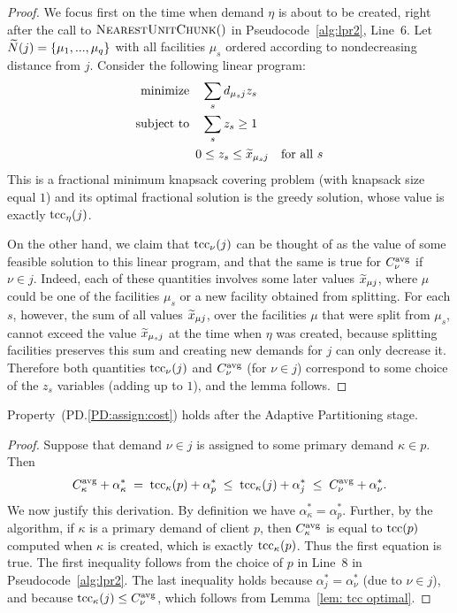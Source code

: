 \documentclass{llncs}
\begin{document}
\begin{proof}
  We focus first on the time when demand $\eta$ is about to be created,
  right after the call to ${\textsc{NearestUnitChunk}}()$ in
  Pseudocode~\ref{alg:lpr2}, Line~6.  Let ${\widetilde N}(j) =
  \{\mu_1,...,\mu_q\}$ with all facilities $\mu_s$ ordered
  according to nondecreasing distance from $j$.  Consider
  the following linear program:
%
\begin{alignat*}{1}
	\textrm{minimize} \quad & \sum_s d_{\mu_s j}z_s
			\\
	\textrm{subject to} \quad & \sum_s z_s  \ge 1
			\\
 	0 &\le z_s \le {\widetilde x}_{\mu_s j} \quad \textrm{for all}\ s
\end{alignat*}
%
  This is a fractional
  minimum knapsack covering problem (with knapsack size equal $1$) and its optimal fractional
  solution is the greedy solution, whose value is exactly
  $\textrm{tcc}_\eta(j)$.  

On the other hand, we claim that
  $\textrm{tcc}_\nu(j)$ can be thought of as the value of some feasible
  solution to this linear program, and that the same is true for $C^{{\mbox{\scriptsize\rm avg}}}_{\nu}$ if $\nu\in j$.
  Indeed, each of these
  quantities involves some later values ${\widetilde x}_{\mu j}$,
  where $\mu$ could be one of the facilities $\mu_s$ or a
  new facility obtained from splitting. For each $s$,
  however, the sum of all values ${\widetilde x}_{\mu j}$,
  over the facilities $\mu$ that were split from $\mu_s$, cannot exceed
 the value ${\widetilde x}_{\mu_s j}$ at the time when
  $\eta$ was created, because splitting facilities preserves this sum and
 creating new demands for $j$ can only decrease it.
Therefore both quantities
  $\textrm{tcc}_\nu(j)$ and $C^{{\mbox{\scriptsize\rm avg}}}_{\nu}$ (for $\nu\in j$) correspond to some
  choice of the $z_s$ variables (adding up to $1$), and the
  lemma follows.
\end{proof}


\begin{lemma}\label{lem: PD:assign:cost holds}
Property~(PD.\ref{PD:assign:cost}) holds after the Adaptive Partitioning stage.
\end{lemma}

\begin{proof}
Suppose that demand $\nu\in j$ is assigned to some primary demand $\kappa\in p$.
Then
%
\begin{eqnarray*}
 C^{{\mbox{\scriptsize\rm avg}}}_{\kappa} + \alpha_{\kappa}^\ast \;=\; \textrm{tcc}_\kappa(p) + \alpha^\ast_p
 					\;\le\; \textrm{tcc}_\kappa(j) + \alpha^\ast_j   
					\;\le\; C^{{\mbox{\scriptsize\rm avg}}}_{\nu} + \alpha^\ast_\nu.
\end{eqnarray*}
%
We now justify this derivation. By definition we have
$\alpha_{\kappa}^\ast = \alpha^\ast_p$.  Further, by the
algorithm, if $\kappa$ is a primary demand of client $p$,
then $C^{{\mbox{\scriptsize\rm avg}}}_{\kappa}$ is equal to $\textrm{tcc}(p)$ computed when
$\kappa$ is created, which is exactly $\textrm{tcc}_\kappa(p)$. Thus
the first equation is true. The first inequality follows
from the choice of $p$ in Line~8 in
Pseudocode~\ref{alg:lpr2}. The last inequality holds
because $\alpha^\ast_j = \alpha^\ast_\nu$ (due to $\nu\in
j$), and because $\textrm{tcc}_\kappa(j) \le C^{{\mbox{\scriptsize\rm avg}}}_{\nu}$, which
follows from Lemma~\ref{lem: tcc optimal}.
\end{proof}
\end{document}
